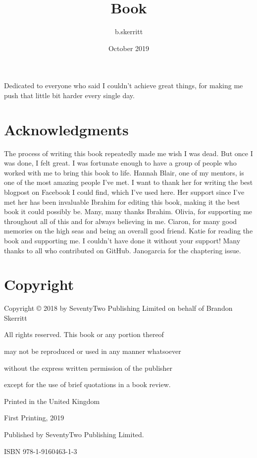\documentclass{article}
\title{Book}
\author{b.skerritt }
\date{October 2019}
\begin{document}
\raggedright




\begin{flushleft}
\clearpage
{}
Dedicated to everyone who said I couldn't achieve great things, for
making me push that little bit harder every single day.
\end{flushleft}
\newpage
\section*{Acknowledgments}


The process of writing this book repeatedly made me wish I was dead. But
once I was done, I felt great. I was fortunate enough to have a group of
people who worked with me to bring this book to life.
\bigbreak
Hannah Blair, one of my mentors, is one of the most amazing people I've
met. I want to thank her for writing the best blogpost on Facebook I
could find, which I've used here. Her support since I've met her has
been invaluable
\bigbreak
Ibrahim for editing this book, making it the best book it could possibly
be. Many, many thanks Ibrahim.
\bigbreak
Olivia, for supporting me throughout all of this and for always
believing in me.
\bigbreak
Ciaron, for many good memories on the high seas and being an overall
good friend.
\bigbreak
Katie for reading the book and supporting me. I couldn't have done it
without your support!
\bigbreak
Many thanks to all who contributed on GitHub. Janogarcia for the
chaptering issue.

\newpage
\section*{Copyright}
Copyright © 2018 by SeventyTwo Publishing Limited on behalf of Brandon
Skerritt

All rights reserved. This book or any portion thereof

may not be reproduced or used in any manner whatsoever

without the express written permission of the publisher

except for the use of brief quotations in a book review.

Printed in the United Kingdom

First Printing, 2019

Published by SeventyTwo Publishing Limited.

ISBN 978-1-9160463-1-3
\end{document}
